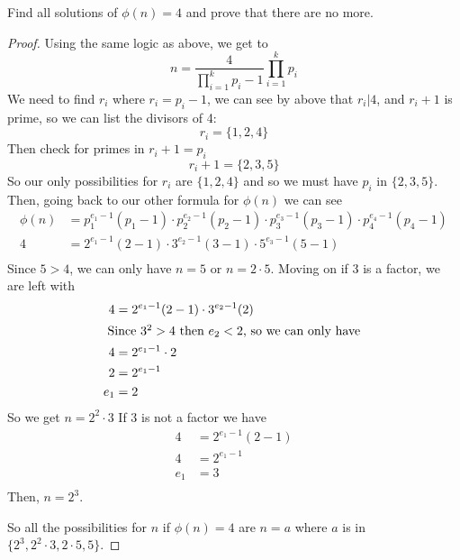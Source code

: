 \documentclass[11pt]{article}
\newenvironment{problem}[2][Problem]{\begin{trivlist}
\item[\hskip \labelsep {\bfseries #1}\hskip \labelsep {\bfseries #2.}]}{\end{trivlist}}
\begin{document}
\begin{problem}{15}
Find all solutions of $\phi(n)=4$ and prove that there are no more.
\end{problem}

\begin{proof}
    Using the same logic as above, we get to
    \[
        n       = \frac{4}{\prod^{k}_{i=1} p_i-1}  \prod^{k}_{i=1} p_i
    \]
    We need to find $r_i$ where $r_i=p_i-1$, we can see by above that $r_i|4$, and $r_i+1$ is prime, so we can list the divisors of 4:
    \[
        r_i = \{1, 2, 4\}
    \]
    Then check for primes in $r_i+1=p_i$
    \[
        r_i +1  = \{2, 3, 5\}
    \]
    So our only possibilities for $r_i$ are $\{1,2,4\}$ and so we must have $p_i$ in $\{2,3,5\}$. Then, going back to our other formula for $\phi(n)$ we can see
    \begin{align*}
        \phi(n) & = p_1^{e_1-1} (p_1-1) \cdot p_2^{e_2-1} (p_2-1) \cdot p_3^{e_3-1} (p_3-1) \cdot p_4^{e_4-1} (p_4-1) \\
        4       & = 2^{e_1-1} (2-1) \cdot 3^{e_2-1} (3-1) \cdot 5^{e_3-1} (5-1)                                       \\
    \end{align*}
    Since $5>4$, we can only have $n=5$ or $n=2 \cdot 5$.
    Moving on if 3 is a factor, we are left with
    \begin{align*}
        4   & = 2^{e_1-1} (2-1) \cdot 3^{e_2-1} (2) \\
        \intertext{  Since $3^2>4$ then $e_2<2$, so we can only have }
        4   & = 2^{e_1-1} \cdot 2                   \\
        2   & = 2^{e_1-1}                           \\
        e_1 & = 2                                   \\
    \end{align*}
    So we get $n=2^2\cdot 3$
    If 3 is not a factor we have
    \begin{align*}
        4   & = 2^{e_1-1} (2-1) \\
        4   & = 2^{e_1-1}       \\
        e_1 & = 3               \\
    \end{align*}
    Then, $n=2^3$.

    So all the possibilities for $n$ if $\phi(n)=4$ are $n=a$ where $a$ is in $\{2^3, 2^2\cdot 3, 2\cdot 5, 5\}$.
\end{proof}
\end{document}
